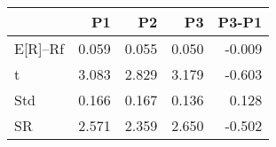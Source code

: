 \begin{tabular}{lrrrr}
\toprule
 & P1 & P2 & P3 & P3-P1 \\
\midrule
E[R]--Rf & 0.059 & 0.055 & 0.050 & -0.009 \\
t & 3.083 & 2.829 & 3.179 & -0.603 \\
Std & 0.166 & 0.167 & 0.136 & 0.128 \\
SR & 2.571 & 2.359 & 2.650 & -0.502 \\
\bottomrule
\end{tabular}
